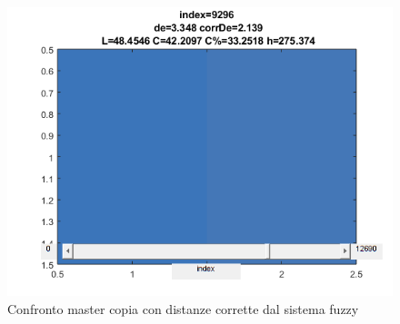 \begin{figure}[!ht]
\begin{center}
	\includegraphics[scale=0.5]{images/9296.png}
\end{center}
\caption{Confronto master copia con distanze corrette dal sistema fuzzy}
\label{fig:decorrde}
\end{figure}

